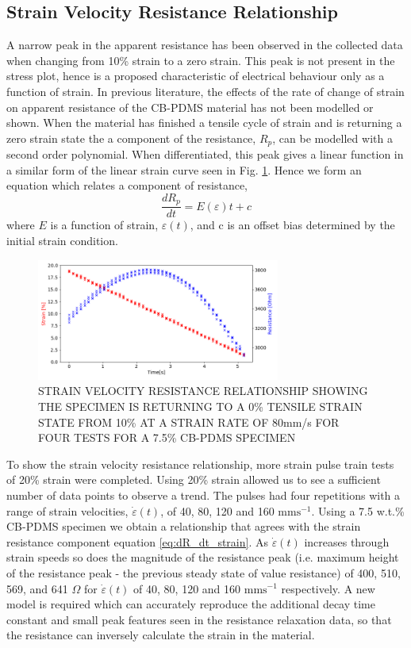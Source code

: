 \subsection*{Strain Velocity Resistance Relationship}
A narrow peak in the apparent resistance has been observed in the collected data when changing from 10\% strain to a zero strain. This peak is not present in the stress plot, hence is a proposed characteristic of electrical behaviour only as a function of strain. In previous literature, the effects of the rate of change of strain on apparent resistance of the CB-PDMS material has not been modelled or shown. When the material has finished a tensile cycle of strain and is returning a zero strain state the a component of the resistance, $R_p$, can be modelled with a second order polynomial. When differentiated, this peak gives a linear function in a similar form of the linear strain curve seen in Fig. \ref{fig:poly2_r_strain}. Hence we form an equation which relates a component of resistance,
\begin{equation} 
    \frac{dR_p}{dt} = E(\varepsilon)t + c
    \label{eq:dR_dt_strain}
\end{equation}
where $E$ is a function of strain, $\varepsilon(t)$, and c is an offset bias determined by the initial strain condition.
\begin{figure}[h!]
    \centering
    \includegraphics[width=8cm]{Figures/strain_velocity_res_80mms_2_7-5_E4pin_20mm_v11_0.2Strain_velocityprof.png}
    \caption{STRAIN VELOCITY RESISTANCE RELATIONSHIP SHOWING THE SPECIMEN IS RETURNING TO A 0\% TENSILE STRAIN STATE FROM 10\% AT A STRAIN RATE OF 80mm/s FOR FOUR TESTS FOR A 7.5\% CB-PDMS SPECIMEN}
    \label{fig:poly2_r_strain}
\end{figure}
To show the strain velocity resistance relationship, more strain pulse train tests of 20\% strain were completed. Using 20\% strain allowed us to see a sufficient number of data points to observe a trend. The pulses had four repetitions with a range of strain velocities, $\dot{\varepsilon}(t)$, of 40, 80, 120 and 160 $\mathrm{mms^{-1}}$. Using a 7.5 w.t.\% CB-PDMS specimen we obtain a relationship that agrees with the strain resistance component equation \ref{eq:dR_dt_strain}. As $\dot{\varepsilon}(t)$ increases through strain speeds so does the magnitude of the resistance peak (i.e. maximum height of the resistance peak - the previous steady state of value resistance) of 400, 510, 569, and 641 $\Omega$ for $\dot{\varepsilon}(t)$ of 40, 80, 120 and 160 $\mathrm{mms^{-1}}$  respectively. A new model is required which can accurately reproduce the additional decay time constant and small peak features seen in the resistance relaxation data, so that the resistance can inversely calculate the strain in the material. 


